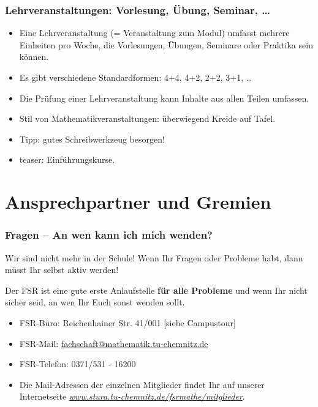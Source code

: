 \documentclass[10pt]{beamer}
\begin{document}
\begin{frame}
	\frametitle{Lehrveranstaltungen: Vorlesung, Übung, Seminar, \ldots}
	\begin{itemize}
		\item Eine Lehrveranstaltung (= Veranstaltung zum Modul) umfasst mehrere Einheiten pro Woche, die Vorlesungen, Übungen, Seminare oder Praktika sein können. 
		\item Es gibt verschiedene Standardformen: 4+4, 4+2, 2+2, 3+1, \ldots
		\item Die Prüfung einer Lehrveranstaltung kann Inhalte aus allen Teilen umfassen.
		\item Stil von Mathematikveranstaltungen: überwiegend Kreide auf Tafel.
		\item Tipp: gutes Schreibwerkzeug besorgen!
		\item teaser: Einführungskurse.
	\end{itemize}
\end{frame}


\section{Ansprechpartner und Gremien}
\frame{\tableofcontents[currentsection]}

\begin{frame}
	\frametitle{Fragen -- An wen kann ich mich wenden?}

	Wir sind nicht mehr in der Schule! Wenn Ihr Fragen oder Probleme habt, dann müsst Ihr selbst aktiv werden!

	\begin{block}{\vphantom{X}}
		Der FSR ist eine gute erste Anlaufstelle \textbf{für alle Probleme} und wenn Ihr nicht sicher seid, an wen Ihr Euch sonst wenden sollt.
	\end{block}

	\begin{itemize}
		\item FSR-Büro: Reichenhainer Str. 41/001 [siehe Campustour]
		\item FSR-Mail: \href{mailto:fachschaft@mathematik.tu-chemnitz.de}{fachschaft@mathematik.tu-chemnitz.de} 
		\item FSR-Telefon: 0371/531 - 16200
		\item Die Mail-Adressen der einzelnen Mitglieder findet Ihr auf unserer Internetseite \textit{\href{https://www.stura.tu-chemnitz.de/fsrmathe/mitglieder}{www.stura.tu-chemnitz.de/fsrmathe/mitglieder}}.
	\end{itemize}
\end{frame}
\end{document}
